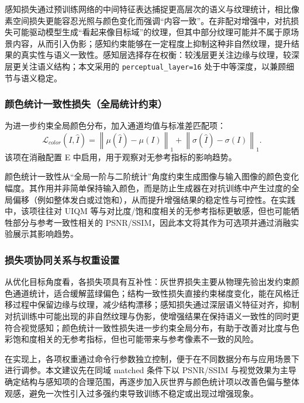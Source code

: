 \documentclass[a4paper,zihao=-4,linespread=1.25]{ctexart}
\begin{document}
感知损失通过预训练网络的中间特征表达捕捉更高层次的语义与纹理统计，相比像素空间损失更能容忍光照与颜色变化而强调“内容一致”。在非配对增强中，对抗损失可能驱动模型生成“看起来像目标域”的纹理，但其中部分纹理可能并不属于原场景内容，从而引入伪影；感知约束能够在一定程度上抑制这种非自然纹理，提升结果的真实性与语义一致性。感知层选择存在权衡：较浅层更关注边缘与纹理，较深层更关注语义结构；本文采用的 \texttt{perceptual\_layer=16} 处于中等深度，以兼顾细节与语义稳定。

\subsubsection{颜色统计一致性损失（全局统计约束）}
为进一步约束全局颜色分布，加入通道均值与标准差匹配项：
\begin{equation}
\mathcal{L}_{color}(I,\hat{I})=\left\|\mu(\hat{I})-\mu(I)\right\|_1+\left\|\sigma(\hat{I})-\sigma(I)\right\|_1.
\end{equation}
该项在消融配置 E 中启用，用于观察对无参考指标的影响趋势。

颜色统计一致性从“全局一阶与二阶统计”角度约束生成图像与输入图像的颜色变化幅度。其作用并非简单保持输入颜色，而是防止生成器在对抗训练中产生过度的全局偏移（例如整体发白或过饱和），从而提升增强结果的稳定性与可控性。在实践中，该项往往对 UIQM 等与对比度/饱和度相关的无参考指标更敏感，但也可能牺牲部分与参考一致性相关的 PSNR/SSIM，因此本文将其作为可选项并通过消融实验展示其影响趋势。

\subsubsection{损失项协同关系与权重设置}
从优化目标角度看，各损失项具有互补性：灰世界损失主要从物理先验出发约束颜色通道统计，适合缓解蓝绿偏色；结构一致性损失直接约束梯度变化，能在风格迁移过程中保留边缘与纹理，减少结构漂移；感知损失通过深层语义特征对齐，抑制对抗训练中可能出现的非自然纹理与伪影，使增强结果在保持语义一致性的同时更符合视觉感知；颜色统计一致性损失进一步约束全局分布，有助于改善对比度与色彩饱和度相关的无参考指标，但也可能带来与参考像素不一致的风险。

在实现上，各项权重通过命令行参数独立控制，便于在不同数据分布与应用场景下进行调参。本文建议先在同域 matched 条件下以 PSNR/SSIM 与视觉效果为主导确定结构与感知项的合理范围，再逐步加入灰世界与颜色统计项以改善色偏与整体观感，避免一次性引入过多强约束导致训练不稳定或出现过增强现象。
\end{document}
